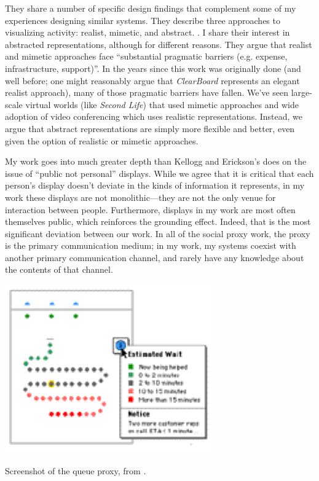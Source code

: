 \documentclass{tufte-handout}
\begin{document}
They share a number of specific design findings that complement some of my experiences designing similar systems. They describe three approaches to visualizing activity: realist, mimetic, and abstract. \citep{Erickson:2003td}. I share their interest in abstracted representations, although for different reasons. They argue that realist and mimetic approaches face ``substantial pragmatic barriers (e.g. expense, infrastructure, support)''. In the years since this work was originally done (and well before; one might reasonably argue that \emph{ClearBoard} \citep{Ishii:1992bq} represents an elegant realist approach), many of those pragmatic barriers have fallen. We've seen large-scale virtual worlds (like \emph{Second Life}) that used mimetic approaches and wide adoption of video conferencing which uses realistic representations. Instead, we argue that abstract representations are simply more flexible and better, even given the option of realistic or mimetic approaches.


My work goes into much greater depth than Kellogg and Erickson's does on the issue of ``public not personal'' displays. While we agree that it is critical that each person's display doesn't deviate in the kinds of information it represents, in my work these displays are not monolithic---they are not the only venue for interaction between people. Furthermore, displays in my work are most often themselves public, which reinforces the grounding effect. Indeed, that is the most significant deviation between our work. In all of the social proxy work, the proxy is the primary communication medium; in my work, my systems coexist with another primary communication channel, and rarely have any knowledge about the contents of that channel. 




\begin{marginfigure}
	\includegraphics{figures/queue.png}
	\caption{Screenshot of the queue proxy, from \citep{Erickson:2003td}.}
	\label{fig:proxy-queue}
\end{marginfigure}
\end{document}
